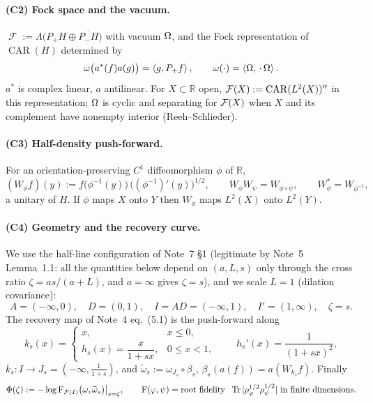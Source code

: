 \documentclass[11pt]{article}
\newcommand{\Pp}{P_+}\newcommand{\Pm}{P_-}
\DeclareMathOperator{\Fock}{\mathcal F}
\newcommand{\CAR}{\operatorname{CAR}}\newcommand{\Stwo}{\mathfrak S_2}\newcommand{\Sone}{\mathfrak S_1}
\newcommand{\ip}[2]{\left\langle #1,#2\right\rangle}\newcommand{\one}{\mathbf 1}
\begin{document}
\paragraph{(C2) Fock space and the vacuum.}
$\Fock:=\Lambda\bigl(\Pp H\oplus\overline{\Pm H}\bigr)$ with vacuum $\Omega$, and the Fock
representation of $\CAR(H)$ determined by
\begin{equation}\label{eq:qf}
 \omega\bigl(a^*(f)a(g)\bigr)=\ip{g}{\Pp f},\qquad \omega(\cdot)=\ip{\Om}{\,\cdot\,\Om}.
\end{equation}
$a^*$ is complex linear, $a$ antilinear.  For $X\subset\mathbb R$ open, $\cF(X):=\CAR(L^2(X))''$
in this representation; $\Omega$ is cyclic and separating for $\mathcal F(X)$ when $X$ and its complement
have nonempty interior (Reeh--Schlieder).

\paragraph{(C3) Half-density push-forward.}
For an orientation-preserving $C^1$ diffeomorphism $\phi$ of $\mathbb R$,
\begin{equation}\label{eq:pushforward}
 (W_\phi f)(y):=f\bigl(\phi^{-1}(y)\bigr)\,\bigl((\phi^{-1})'(y)\bigr)^{1/2},
 \qquad W_\phi W_\psi=W_{\phi\circ\psi},\qquad W_\phi^*=W_{\phi^{-1}},
\end{equation}
a unitary of $H$.  If $\phi$ maps $X$ onto $Y$ then $W_\phi$ maps $L^2(X)$ onto $L^2(Y)$.

\paragraph{(C4) Geometry and the recovery curve.}
We use the half-line configuration of Note~7 \S1 (legitimate by Note~5 Lemma~1.1: all the
quantities below depend on $(a,L,s)$ only through the cross ratio $\zeta=as/(a+L)$, and
$a=\infty$ gives $\zeta=s$), and we scale $L=1$ (dilation covariance):
\begin{equation}\label{eq:geom}
 A=(-\infty,0),\quad D=(0,1),\quad I=AD=(-\infty,1),\quad I'=(1,\infty),\quad \zeta=s .
\end{equation}
The recovery map of Note~4 eq.~(5.1) is the push-forward along
\begin{equation}\label{eq:ks}
 k_s(x)=\begin{cases} x,& x\le 0,\\[1mm] h_s(x)=\dfrac{x}{1+sx},& 0\le x<1,\end{cases}
 \qquad h_s'(x)=\frac1{(1+sx)^2},
\end{equation}
$k_s:I\to J_s=(-\infty,\tfrac1{1+s})$, and $\widetilde\omega_s:=\omega_{J_s}\circ\beta_s$,
$\beta_s(a(f))=a(W_{k_s}f)$.  Finally
\begin{equation}\label{eq:Phi}
 \Phi(\zeta):=-\log\operatorname{F}_{\mathcal F(I)}\bigl(\omega,\widetilde\omega_s\bigr)\big|_{s=\zeta},
 \qquad \operatorname{F}(\varphi,\psi)=\text{root fidelity }\;\operatorname{Tr}|\rho_\varphi^{1/2}\rho_\psi^{1/2}|
 \text{ in finite dimensions.}
\end{equation}
\end{document}

